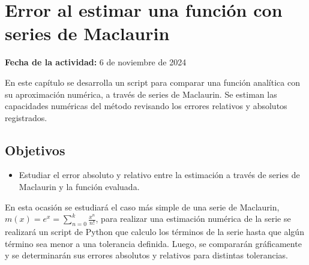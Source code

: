 \documentclass[../portafolio.tex]{subfiles}
\begin{document}
\chapter{Error al estimar una función con series de Maclaurin }
\label{g1_ej20}
\hfill \textbf{Fecha de la actividad:} 6 de noviembre de 2024

\medskip
En este capítulo se desarrolla un script para comparar una función analítica con su aproximación numérica, a través de series de Maclaurin. Se estiman las capacidades numéricas del método revisando los errores relativos y absolutos registrados.
\section*{Objetivos}
\begin{itemize}
\item Estudiar el error absoluto y relativo entre la estimación a través de series de Maclaurin y la función evaluada.
\end{itemize}

En esta ocasión se estudiará el caso más simple de una serie de Maclaurin, $m(x)=e^x=\sum_{n=0}^{k} \frac{x^n}{n!}$, para realizar una estimación numérica de la serie se realizará un script de Python que calculo los términos de la serie hasta que algún término sea menor a una tolerancia definida. Luego, se compararán gráficamente y se determinarán sus errores absolutos y relativos para distintas tolerancias.
\end{document}
